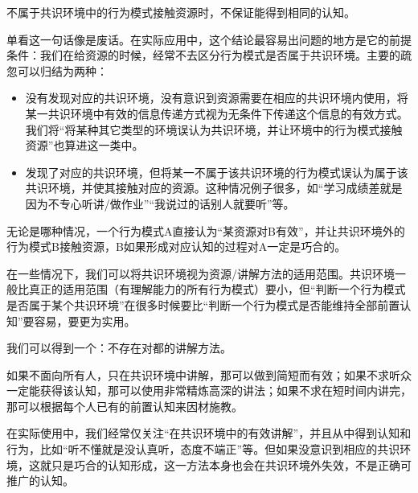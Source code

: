 不属于共识环境中的行为模式接触资源时，不保证能得到相同的认知。
\begin{explain}
单看这一句话像是废话。在实际应用中，这个结论最容易出问题的地方是它的前提条件：我们在给资源的时候，经常不去区分行为模式是否属于共识环境。主要的疏忽可以归结为两种：
\begin{itemize}
\item 没有发现对应的共识环境，没有意识到资源需要在相应的共识环境内使用，将某一共识环境中有效的信息传递方式视为无条件下传递这个信息的有效方式。我们将“将某种其它类型的环境误认为共识环境，并让环境中的行为模式接触资源”也算进这一类中。
\item 发现了对应的共识环境，但将某一不属于该共识环境的行为模式误认为属于该共识环境，并使其接触对应的资源。这种情况例子很多，如“学习成绩差就是因为不专心听讲/做作业”“我说过的话别人就要听”等。
\end{itemize}
无论是哪种情况，一个行为模式A直接认为“某资源对B有效”，并让共识环境外的行为模式B接触资源，B如果形成对应认知的过程对A一定是巧合的。

在一些情况下，我们可以将共识环境视为资源/讲解方法的适用范围。共识环境一般比真正的适用范围（有理解能力的所有行为模式）要小，但“判断一个行为模式是否属于某个共识环境”在很多时候要比“判断一个行为模式是否能维持全部前置认知”要容易，要更为实用。
\end{explain}
我们可以得到一个：不存在对都的讲解方法。
\begin{explain}
如果不面向所有人，只在共识环境中讲解，那可以做到简短而有效；如果不求听众一定能获得该认知，那可以使用非常精炼高深的讲法；如果不求在短时间内讲完，那可以根据每个人已有的前置认知来因材施教。

在实际使用中，我们经常仅关注“在共识环境中的有效讲解”，并且从中得到认知和行为，比如“听不懂就是没认真听，态度不端正”等。但如果没意识到相应的共识环境，这就只是巧合的认知形成，这一方法本身也会在共识环境外失效，不是正确可推广的认知。
\end{explain}

